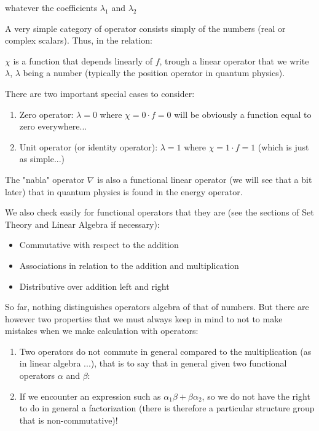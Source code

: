 	whatever the coefficients $\lambda_1$ and $\lambda_2$

	A very simple category of operator consists simply of the numbers (real or complex scalars). Thus, in the relation:
	
	$\chi$ is a function that depends linearly of $f$, trough a linear operator that we write $\lambda$, $\lambda$ being a number (typically the position operator in quantum physics).

	There are two important special cases to consider:
	\begin{enumerate}
		\item Zero operator: $\lambda=0$ where $\chi=0\cdot f=0$ will be obviously a function equal to zero everywhere...

		\item Unit operator (or identity operator): $\lambda=1$ where $\chi=1\cdot f=1$ (which is just as simple...)
	\end{enumerate}
	\begin{tcolorbox}[title=Remark,colframe=black,arc=10pt]
	The "nabla" operator $\nabla$ is also a functional linear operator (we will see that a bit later) that in quantum physics is found in the energy operator.
	\end{tcolorbox}
	We also check easily for functional operators that they are (see the sections of Set Theory and Linear Algebra if necessary):
	\begin{itemize}
		\item Commutative with respect to the addition
	
		\item Associations in relation to the addition and multiplication
		
		\item Distributive over addition left and right
	\end{itemize}
	So far, nothing distinguishes operators algebra of that of numbers. But there are however two properties that we must always keep in mind to not to make mistakes when we make calculation with operators:
	\begin{enumerate}
		\item Two operators do not commute in general compared to the multiplication (as in linear algebra ...), that is to say that in general given two functional operators $\alpha$ and $\beta$:
		

		\item If we encounter an expression such as $\alpha_1\beta+\beta\alpha_2$, so we do not have the right to do in general a factorization (there is therefore a particular structure group that is non-commutative)!
	\end{enumerate}
